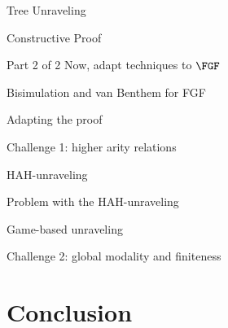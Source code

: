 \documentclass[169]{beamer}
\begin{document}
\begin{frame}{Tree Unraveling}

\end{frame}

\begin{frame}{Constructive Proof}

\end{frame}

\begin{frame}{Part 2 of 2}
  Now, adapt techniques to $\FGF$
\end{frame}

\begin{frame}{Bisimulation and van Benthem for FGF}

\end{frame}

\begin{frame}{Adapting the proof}

\end{frame}

\begin{frame}{Challenge 1: higher arity relations}

\end{frame}

\begin{frame}{HAH-unraveling}

\end{frame}

\begin{frame}{Problem with the HAH-unraveling}

\end{frame}

\begin{frame}{Game-based unraveling}

\end{frame}

\begin{frame}{Challenge 2: global modality and finiteness}

\end{frame}

\section{Conclusion}
\end{document}

